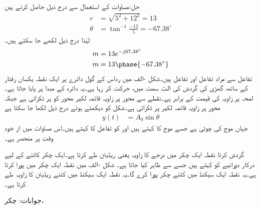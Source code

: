 حل:مساوات  کے استعمال سے درج ذیل حاصل کرتے ہیں
\begin{align*}
r&=\sqrt{5^2+12^2}=13\\
\theta&=\tan^{-1}\frac{-12}{5}=-67.38^{\circ}
\end{align*}
لہٰذا درج ذیل لکھے جا سکتے ہیں۔
\begin{align*}
m&=13 e^{-j67.38^{\circ}}\\
m&=13\phase{-67.38^{\circ}}
\end{align*}
 تفاعل سے مراد  تفاعل  اور  تفاعل  ہیں۔شکل -الف میں رداس  کے گول دائرے پر ایک نقطہ یکساں رفتار کے ساتھ، گھڑی کی گردش کی الٹ سمت میں، حرکت کر رہا ہے۔یہ دائرہ  کے مبدا  پر پایا جاتا ہے۔لمحہ  پر زاویہ  کی قیمت  کے برابر ہے۔نقطے سے محور   پر  زاویہ قائمہ لکیر محور کو    پر ٹکراتی ہے جبکہ محور    پر  زاویہ قائمہ  لکیر  پر ٹکراتی ہے۔شکل کو دیکھتے ہوئے درج ذیل لکھا جا سکتا ہے
\begin{align}\label{مساوات_بدلتا_سائن_نما_تفاعل_الف}
y(t)&=A_0 \sin \theta
\end{align}
جہاں  موج کی چوٹی ہے جسے موج کا  کہتے ہیں اور  کو تفاعل کا  کہتے ہیں۔اس مساوات میں  از خود وقت پر منحصر ہے۔

 گردش کرتا نقطہ ایک چکر میں  درجے کا زاویہ یعنی  ریڈیئن طے کرتا ہے۔ایک چکر کاٹنے کے لیے درکار دورانیے کو  کہتے ہیں جسے  سے ظاہر کیا جاتا ہے۔
شکل -الف میں نقطہ ایک چکر  میں پورا کرتا ہے۔یہ نقطہ ایک سیکنڈ میں کتنے چکر پورا کرے گا۔یہ نقطہ ایک سیکنڈ میں کتنے ریڈیئن کا زاویہ طے کرتا ہے۔

جوابات: چکر، 

